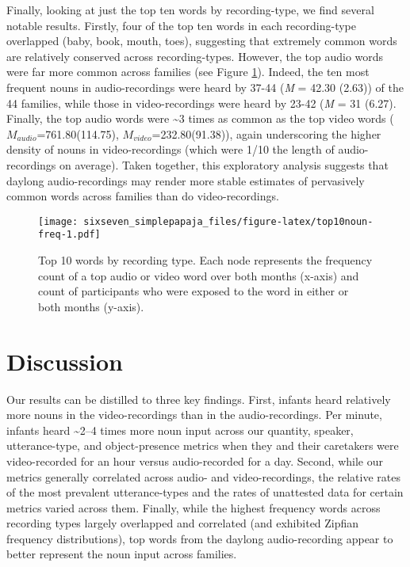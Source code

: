 \documentclass[floatsintext,man]{apa6}
\theoremstyle{definition}
\theoremstyle{definition}
\theoremstyle{definition}
\theoremstyle{remark}
\begin{document}
Finally, looking at just the top ten words by recording-type, we find
several notable results. Firstly, four of the top ten words in each
recording-type overlapped (baby, book, mouth, toes), suggesting that
extremely common words are relatively conserved across recording-types.
However, the top audio words were far more common across families (see
Figure \ref{fig:top10noun-freq}). Indeed, the ten most frequent nouns in
audio-recordings were heard by 37-44 (\emph{M} = 42.30 (2.63)) of the 44
families, while those in video-recordings were heard by 23-42 (\emph{M}
= 31 (6.27). Finally, the top audio words were \textasciitilde{}3 times
as common as the top video words (\(M_{audio}\)=761.80(114.75),
\(M_{video}\)=232.80(91.38)), again underscoring the higher density of
nouns in video-recordings (which were 1/10 the length of
audio-recordings on average). Taken together, this exploratory analysis
suggests that daylong audio-recordings may render more stable estimates
of pervasively common words across families than do video-recordings.

\begin{figure}
\centering
\texttt{[image: sixseven\_simplepapaja\_files/figure-latex/top10noun-freq-1.pdf]}
\caption{\label{fig:top10noun-freq}Top 10 words by recording type. Each node
represents the frequency count of a top audio or video word over both
months (x-axis) and count of participants who were exposed to the word
in either or both months (y-axis).}
\end{figure}

\hypertarget{discussion}{%
\section{Discussion}\label{discussion}}

Our results can be distilled to three key findings. First, infants heard
relatively more nouns in the video-recordings than in the
audio-recordings. Per minute, infants heard \textasciitilde{}2--4 times
more noun input across our quantity, speaker, utterance-type, and
object-presence metrics when they and their caretakers were
video-recorded for an hour versus audio-recorded for a day. Second,
while our metrics generally correlated across audio- and
video-recordings, the relative rates of the most prevalent
utterance-types and the rates of unattested data for certain metrics
varied across them. Finally, while the highest frequency words across
recording types largely overlapped and correlated (and exhibited Zipfian
frequency distributions), top words from the daylong audio-recording
appear to better represent the noun input across families.
\end{document}
